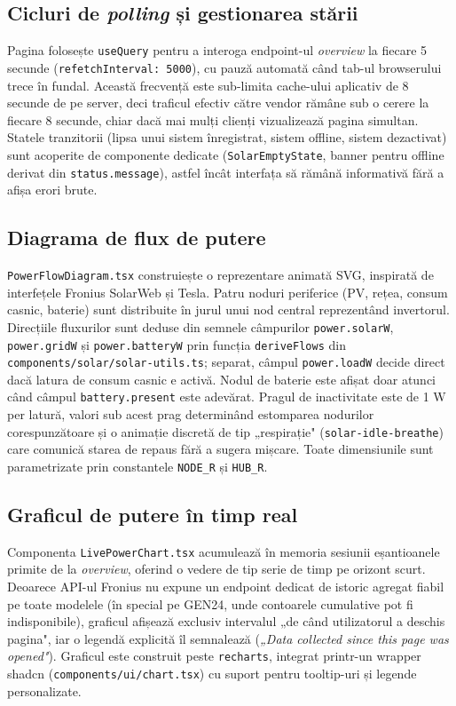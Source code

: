 \subsection{Cicluri de \textit{polling} și gestionarea stării}
Pagina folosește \texttt{useQuery} pentru a interoga endpoint-ul \emph{overview} la fiecare 5 secunde (\texttt{refetchInterval: 5000}), cu pauză automată când tab-ul browserului trece în fundal. Această frecvență este sub-limita cache-ului aplicativ de 8 secunde de pe server, deci traficul efectiv către vendor rămâne sub o cerere la fiecare 8 secunde, chiar dacă mai mulți clienți vizualizează pagina simultan. Statele tranzitorii (lipsa unui sistem înregistrat, sistem offline, sistem dezactivat) sunt acoperite de componente dedicate (\texttt{SolarEmptyState}, banner pentru offline derivat din \texttt{status.message}), astfel încât interfața să rămână informativă fără a afișa erori brute.

\subsection{Diagrama de flux de putere}
\texttt{PowerFlowDiagram.tsx} construiește o reprezentare animată SVG, inspirată de interfețele Fronius SolarWeb și Tesla. Patru noduri periferice (PV, rețea, consum casnic, baterie) sunt distribuite în jurul unui nod central reprezentând invertorul. Direcțiile fluxurilor sunt deduse din semnele câmpurilor \texttt{power.solarW}, \texttt{power.gridW} și \texttt{power.batteryW} prin funcția \texttt{deriveFlows} din \texttt{components/solar/solar-utils.ts}; separat, câmpul \texttt{power.loadW} decide direct dacă latura de consum casnic e activă. Nodul de baterie este afișat doar atunci când câmpul \texttt{battery.present} este adevărat. Pragul de inactivitate este de 1 W per latură, valori sub acest prag determinând estomparea nodurilor corespunzătoare și o animație discretă de tip „respirație" (\texttt{solar-idle-breathe}) care comunică starea de repaus fără a sugera mișcare. Toate dimensiunile sunt parametrizate prin constantele \texttt{NODE\_R} și \texttt{HUB\_R}.

\subsection{Graficul de putere în timp real}
Componenta \texttt{LivePowerChart.tsx} acumulează în memoria sesiunii eșantioanele primite de la \emph{overview}, oferind o vedere de tip serie de timp pe orizont scurt. Deoarece API-ul Fronius nu expune un endpoint dedicat de istoric agregat fiabil pe toate modelele (în special pe GEN24, unde contoarele cumulative pot fi indisponibile), graficul afișează exclusiv intervalul „de când utilizatorul a deschis pagina", iar o legendă explicită îl semnalează (\emph{„Data collected since this page was opened"}). Graficul este construit peste \texttt{recharts}, integrat printr-un wrapper shadcn (\texttt{components/ui/chart.tsx}) cu suport pentru tooltip-uri și legende personalizate.

